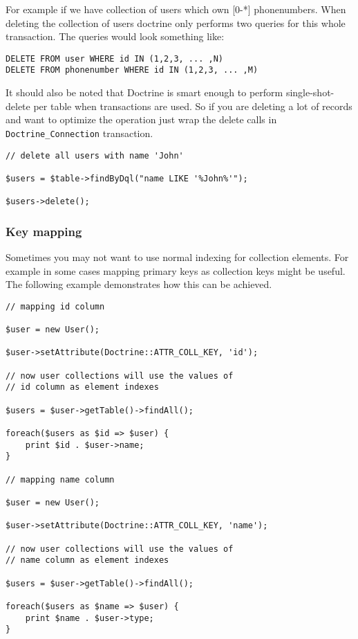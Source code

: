 \documentclass[11pt,a4paper]{report}
\begin{document}
For example if we have collection of users which own [0-*] phonenumbers. When deleting the collection\newline
of users doctrine only performs two queries for this whole transaction. The queries would look something like:

\begin{verbatim}
DELETE FROM user WHERE id IN (1,2,3, ... ,N)
DELETE FROM phonenumber WHERE id IN (1,2,3, ... ,M)
\end{verbatim}

It should also be noted that Doctrine is smart enough to perform single-shot-delete per table when transactions are used. So if you are deleting a lot of records and want to optimize the operation just wrap the delete calls in \texttt{Doctrine\_Connection} transaction.

\begin{verbatim}
// delete all users with name 'John'

$users = $table->findByDql("name LIKE '%John%'");

$users->delete();
\end{verbatim}

\subsubsection{Key mapping}
Sometimes you may not want to use normal indexing for collection elements. For example in some cases mapping primary keys as collection keys might be useful. The following example demonstrates how this can be achieved.

\begin{verbatim}
// mapping id column

$user = new User();

$user->setAttribute(Doctrine::ATTR_COLL_KEY, 'id');

// now user collections will use the values of
// id column as element indexes

$users = $user->getTable()->findAll();

foreach($users as $id => $user) {
    print $id . $user->name;
}

// mapping name column

$user = new User();

$user->setAttribute(Doctrine::ATTR_COLL_KEY, 'name');

// now user collections will use the values of
// name column as element indexes

$users = $user->getTable()->findAll();

foreach($users as $name => $user) {
    print $name . $user->type;
}
\end{verbatim}
\end{document}
